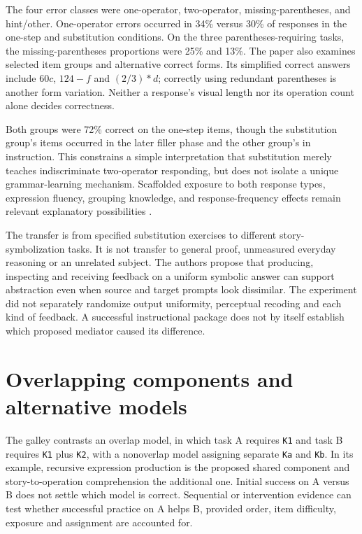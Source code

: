 The four error classes were one-operator, two-operator,
missing-parentheses, and hint/other. One-operator errors occurred
in 34\% versus 30\% of responses in the one-step and substitution
conditions. On the three parentheses-requiring tasks, the
missing-parentheses proportions were 25\% and 13\%.
The paper also examines selected item groups and alternative correct
forms. Its simplified correct answers include \(60c\), \(124-f\)
and \((2/3)*d\); correctly using redundant parentheses is another
form variation. Neither a response's visual length nor its operation
count alone decides correctness.

Both groups were 72\% correct on the one-step items, though the
substitution group's items occurred in the later filler phase and
the other group's in instruction. This constrains a simple
interpretation that substitution merely teaches indiscriminate
two-operator responding, but does not isolate a unique grammar-learning
mechanism. Scaffolded exposure to both response types, expression
fluency, grouping knowledge, and response-frequency effects remain
relevant explanatory possibilities
\cite[pp.~474--476]{KoedingerMcLaughlin2010LanguageTransfer}.

The transfer is from specified substitution exercises to different
story-symbolization tasks. It is not transfer to general proof,
unmeasured everyday reasoning or an unrelated subject. The authors
propose that producing, inspecting and receiving feedback on a
uniform symbolic answer can support abstraction even when source
and target prompts look dissimilar. The experiment did not separately
randomize output uniformity, perceptual recoding and each kind of
feedback. A successful instructional package does not by itself
establish which proposed mediator caused its difference.

\section{Overlapping components and alternative models}
\label{sec:p19-cta-overlap}

The galley contrasts an overlap model, in which task A requires
\texttt{K1} and task B requires \texttt{K1} plus \texttt{K2},
with a nonoverlap model assigning separate \texttt{Ka} and
\texttt{Kb}. In its example, recursive expression production is
the proposed shared component and story-to-operation comprehension
the additional one. Initial success on A versus B does not settle
which model is correct. Sequential or intervention evidence can
test whether successful practice on A helps B, provided order,
item difficulty, exposure and assignment are accounted for.

